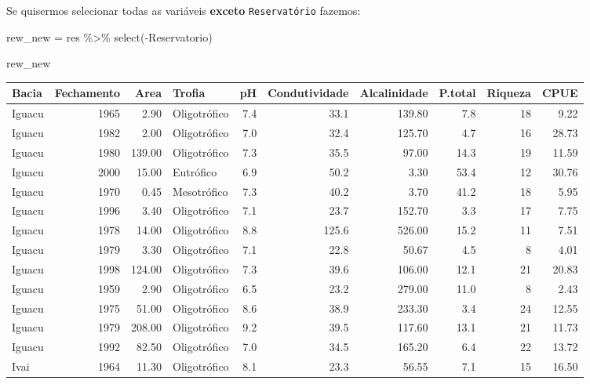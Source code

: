 \documentclass[
]{book}
\newenvironment{Shaded}{\begin{snugshade}}{\end{snugshade}}
\newcommand{\FunctionTok}[1]{\textcolor[rgb]{0.00,0.00,0.00}{#1}}
\newcommand{\NormalTok}[1]{#1}
\newcommand{\OtherTok}[1]{\textcolor[rgb]{0.56,0.35,0.01}{#1}}
\newcommand{\SpecialCharTok}[1]{\textcolor[rgb]{0.00,0.00,0.00}{#1}}
\begin{document}
Se quisermos selecionar todas as variáveis \textbf{exceto} \texttt{Reservatório} fazemos:

\begin{Shaded}
\begin{Highlighting}[]
\NormalTok{rew\_new }\OtherTok{=}\NormalTok{ res }\SpecialCharTok{\%\textgreater{}\%} 
  \FunctionTok{select}\NormalTok{(}\SpecialCharTok{{-}}\NormalTok{Reservatorio)}

\NormalTok{rew\_new}
\end{Highlighting}
\end{Shaded}

\begin{table}
\centering\begingroup\fontsize{8}{10}\selectfont

\begin{tabular}{lrrlrrrrrr}
\toprule
Bacia & Fechamento & Area & Trofia & pH & Condutividade & Alcalinidade & P.total & Riqueza & CPUE\\
\midrule
Iguacu & 1965 & 2.90 & Oligotrófico & 7.4 & 33.1 & 139.80 & 7.8 & 18 & 9.22\\
Iguacu & 1982 & 2.00 & Oligotrófico & 7.0 & 32.4 & 125.70 & 4.7 & 16 & 28.73\\
Iguacu & 1980 & 139.00 & Oligotrófico & 7.3 & 35.5 & 97.00 & 14.3 & 19 & 11.59\\
Iguacu & 2000 & 15.00 & Eutrófico & 6.9 & 50.2 & 3.30 & 53.4 & 12 & 30.76\\
Iguacu & 1970 & 0.45 & Mesotrófico & 7.3 & 40.2 & 3.70 & 41.2 & 18 & 5.95\\
\addlinespace
Iguacu & 1996 & 3.40 & Oligotrófico & 7.1 & 23.7 & 152.70 & 3.3 & 17 & 7.75\\
Iguacu & 1978 & 14.00 & Oligotrófico & 8.8 & 125.6 & 526.00 & 15.2 & 11 & 7.51\\
Iguacu & 1979 & 3.30 & Oligotrófico & 7.1 & 22.8 & 50.67 & 4.5 & 8 & 4.01\\
Iguacu & 1998 & 124.00 & Oligotrófico & 7.3 & 39.6 & 106.00 & 12.1 & 21 & 20.83\\
Iguacu & 1959 & 2.90 & Oligotrófico & 6.5 & 23.2 & 279.00 & 11.0 & 8 & 2.43\\
\addlinespace
Iguacu & 1975 & 51.00 & Oligotrófico & 8.6 & 38.9 & 233.30 & 3.4 & 24 & 12.55\\
Iguacu & 1979 & 208.00 & Oligotrófico & 9.2 & 39.5 & 117.60 & 13.1 & 21 & 11.73\\
Iguacu & 1992 & 82.50 & Oligotrófico & 7.0 & 34.5 & 165.20 & 6.4 & 22 & 13.72\\
Ivai & 1964 & 11.30 & Oligotrófico & 8.1 & 23.3 & 56.55 & 7.1 & 15 & 16.50\\

\end{tabular}
\end{table}
\end{document}
